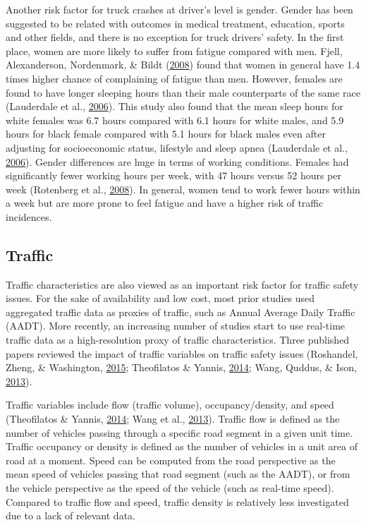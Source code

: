 \documentclass[12pt]{book}
\numberwithin{equation}{chapter}
\begin{document}
Another risk factor for truck crashes at driver's level is gender. Gender has been suggested to be related with outcomes in medical treatment, education, sports and other fields, and there is no exception for truck drivers' safety. In the first place, women are more likely to suffer from fatigue compared with men. Fjell, Alexanderson, Nordenmark, \& Bildt (\protect\hyperlink{ref-fjell2008perceived}{2008}) found that women in general have 1.4 times higher chance of complaining of fatigue than men. However, females are found to have longer sleeping hours than their male counterparts of the same race (Lauderdale et al., \protect\hyperlink{ref-lauderdale2006objectively}{2006}). This study also found that the mean sleep hours for white females was 6.7 hours compared with 6.1 hours for white males, and 5.9 hours for black female compared with 5.1 hours for black males even after adjusting for socioeconomic status, lifestyle and sleep apnea (Lauderdale et al., \protect\hyperlink{ref-lauderdale2006objectively}{2006}). Gender differences are huge in terms of working conditions. Females had significantly fewer working hours per week, with 47 hours versus 52 hours per week (Rotenberg et al., \protect\hyperlink{ref-rotenberg2008gender}{2008}). In general, women tend to work fewer hours within a week but are more prone to feel fatigue and have a higher risk of traffic incidences.

\hypertarget{traffic}{%
\subsection{Traffic}\label{traffic}}

Traffic characteristics are also viewed as an important risk factor for traffic safety issues. For the sake of availability and low cost, most prior studies used aggregated traffic data as proxies of traffic, such as Annual Average Daily Traffic (AADT). More recently, an increasing number of studies start to use real-time traffic data as a high-resolution proxy of traffic characteristics. Three published papers reviewed the impact of traffic variables on traffic safety issues (Roshandel, Zheng, \& Washington, \protect\hyperlink{ref-roshandel2015impact}{2015}; Theofilatos \& Yannis, \protect\hyperlink{ref-theofilatos2014review}{2014}; Wang, Quddus, \& Ison, \protect\hyperlink{ref-wang2013effect}{2013}).

Traffic variables include flow (traffic volume), occupancy/density, and speed (Theofilatos \& Yannis, \protect\hyperlink{ref-theofilatos2014review}{2014}; Wang et al., \protect\hyperlink{ref-wang2013effect}{2013}). Traffic flow is defined as the number of vehicles passing through a specific road segment in a given unit time. Traffic occupancy or density is defined as the number of vehicles in a unit area of road at a moment. Speed can be computed from the road perspective as the mean speed of vehicles passing that road segment (such as the AADT), or from the vehicle perspective as the speed of the vehicle (such as real-time speed). Compared to traffic flow and speed, traffic density is relatively less investigated due to a lack of relevant data.
\end{document}
